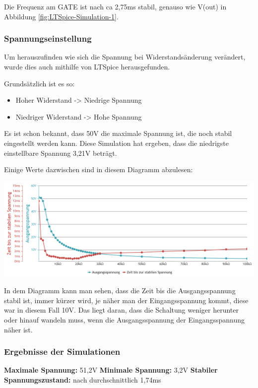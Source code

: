 \documentclass[paper=a4, 12pt]{scrreprt}
\begin{document}
			Die Frequenz am GATE ist nach ca 2,75ms stabil, genauso wie V(out) in Abbildung \ref{fig:LTSpice-Simulation-1}. 
			
			\subsubsection{Spannungseinstellung}\hfill \break
			Um herauszufinden wie sich die Spannung bei Widerstandsänderung verändert, wurde dies auch mithilfe von LTSpice herausgefunden.
			
			Grundsätzlich ist es so:
			\begin{itemize}
				\item Hoher Widerstand -> Niedrige Spannung
				\item Niedriger Widerstand -> Hohe Spannung
			\end{itemize}
			
			Es ist schon bekannt, dass 50V die maximale Spannung ist, die noch stabil eingestellt werden kann. Diese Simulation hat ergeben, dass die niedrigste einstellbare Spannung 3,21V beträgt.
			
			Einige Werte dazwischen sind in diesem Diagramm abzulesen:
			\begin{adjustbox}{center,caption={Spannungsverlauf bei Widerstandsänderung},label={fig:spgVLbWdst},nofloat=figure,vspace=\bigskipamount}
				\includegraphics[width=\textwidth]{img/simulationSPG.PNG}
			\end{adjustbox}
		
			In dem Diagramm kann man sehen, dass die Zeit bis die Ausgangsspannung stabil ist, immer kürzer wird, je näher man der Eingangsspannung kommt, diese war in diesem Fall 10V. Das liegt daran, dass die Schaltung weniger herunter oder hinauf wandeln muss, wenn die Ausgangsspannung der Eingangsspannung näher ist.
		
			\subsubsection{Ergebnisse der Simulationen}\hfill \break
			{\large \textbf{Maximale Spannung:} 51,2V} \hfill \break
			{\large \textbf{Minimale Spannung:} 3,2V}\hfill \break
			{\large \textbf{Stabiler Spannungszustand:} nach durchschnittlich 1,74ms} \hfill \break
			
\end{document}
